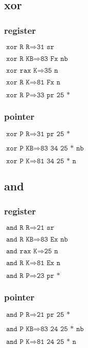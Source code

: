 \documentclass{article}
\begin{document}
\subsection{xor}
\begin{minipage}{\textwidth}

\subsubsection{register}

$\texttt{xor R R} \Rightarrow \texttt{31 sr}$

$\texttt{xor R KB} \Rightarrow \texttt{83 Fx nb}$

$\texttt{xor rax K} \Rightarrow \texttt{35 n}$

$\texttt{xor R K} \Rightarrow \texttt{81 Fx n}$

$\texttt{xor R P} \Rightarrow \texttt{33 pr 25 *}$


\subsubsection{pointer}

$\texttt{xor P R} \Rightarrow \texttt{31 pr 25 *}$

$\texttt{xor P KB} \Rightarrow \texttt{83 34 25 * nb}$

$\texttt{xor P K} \Rightarrow \texttt{81 34 25 * n}$

\end{minipage}


\subsection{and}
\begin{minipage}{\textwidth}

\subsubsection{register}

$\texttt{and R R} \Rightarrow \texttt{21 sr}$

$\texttt{and R KB} \Rightarrow \texttt{83 Ex nb}$

$\texttt{and rax K} \Rightarrow \texttt{25 n}$

$\texttt{and R K} \Rightarrow \texttt{81 Ex n}$

$\texttt{and R P} \Rightarrow \texttt{23 pr *}$

\subsubsection{pointer}

$\texttt{and P R} \Rightarrow \texttt{21 pr 25 *}$

$\texttt{and P KB} \Rightarrow \texttt{83 24 25 * nb}$

$\texttt{and P K} \Rightarrow \texttt{81 24 25 * n}$

\end{minipage}
\end{document}
